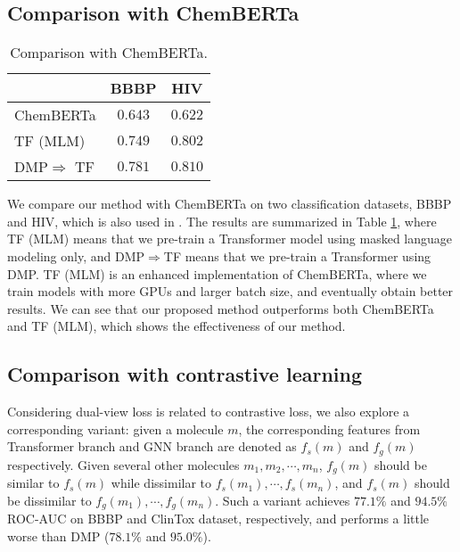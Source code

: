 \documentclass{article}
\newcommand{\ourM}{DMP}
\begin{document}
\subsection{Comparison with ChemBERTa \citep{chithrananda2020chemberta}}\label{appendix:chemberta}
\begin{table}[!htb]
    \centering
    \begin{tabular}{lcc}
    \toprule
    & BBBP &HIV \\
    \midrule
      ChemBERTa &$0.643$  &$0.622$  \\
      TF (MLM) & $0.749$ & $0.802$ \\
      \ourM{}$\Rightarrow$ TF &$0.781$  &$0.810$ \\
      \bottomrule
    \end{tabular}
    \caption{Comparison with ChemBERTa.}
    \label{tab:comwithchemberta}
\end{table}
We compare our method with ChemBERTa \citep{chithrananda2020chemberta} on two classification datasets, BBBP and HIV, which is also used in \citep{chithrananda2020chemberta}.
The results are summarized in Table \ref{tab:comwithchemberta}, where TF (MLM) means that we pre-train a Transformer model using masked language modeling only, and \ourM{}$\Rightarrow$TF means that we pre-train a Transformer using \ourM{}. TF (MLM) is an enhanced implementation of ChemBERTa, where we train models with more GPUs and larger batch size, and eventually obtain better results.
We can see that our proposed method  outperforms both ChemBERTa and TF (MLM), which shows the effectiveness of our method.




\subsection{Comparison with contrastive learning}\label{appendix:contrastive} Considering dual-view loss is related to contrastive loss, we also explore a corresponding variant: given a molecule $m$, the corresponding features from Transformer branch and GNN branch are denoted as $f_s(m)$ and $f_g(m)$ respectively. Given several other molecules $m_1,m_2,\cdots,m_n$, $f_g(m)$ should be similar to $f_s(m)$ while dissimilar to $f_s(m_1),\cdots,f_s(m_n)$, and $f_s(m)$ should be dissimilar to $f_g(m_1),\cdots,f_g(m_n)$. Such a variant achieves $77.1\%$ and $94.5\%$ ROC-AUC on BBBP and ClinTox dataset, respectively, and performs a little worse than \ourM{} ($78.1\%$ and $95.0\%$).
\end{document}
